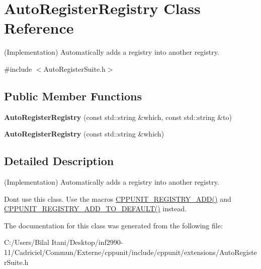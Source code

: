 \hypertarget{class_auto_register_registry}{}\section{Auto\+Register\+Registry Class Reference}
\label{class_auto_register_registry}


(Implementation) Automatically adds a registry into another registry.  




{\ttfamily \#include $<$Auto\+Register\+Suite.\+h$>$}

\subsection*{Public Member Functions}
\begin{DoxyCompactItemize}
\item 
{\bfseries Auto\+Register\+Registry} (const std\+::string \&which, const std\+::string \&to)\hypertarget{class_auto_register_registry_aeb3c0171549420bc18714d4117d9c2b5}{}\label{class_auto_register_registry_aeb3c0171549420bc18714d4117d9c2b5}

\item 
{\bfseries Auto\+Register\+Registry} (const std\+::string \&which)\hypertarget{class_auto_register_registry_a3efb50c6218f5d0e5969eb6fc8bccb23}{}\label{class_auto_register_registry_a3efb50c6218f5d0e5969eb6fc8bccb23}

\end{DoxyCompactItemize}


\subsection{Detailed Description}
(Implementation) Automatically adds a registry into another registry. 

Don\textquotesingle{}t use this class. Use the macros \hyperlink{_helper_macros_8h_a0ca9e37aca06e802300f2572b974e2bb}{C\+P\+P\+U\+N\+I\+T\+\_\+\+R\+E\+G\+I\+S\+T\+R\+Y\+\_\+\+A\+D\+D()} and \hyperlink{_helper_macros_8h_a1dde8c3db38012da58e1e456b7e4e346}{C\+P\+P\+U\+N\+I\+T\+\_\+\+R\+E\+G\+I\+S\+T\+R\+Y\+\_\+\+A\+D\+D\+\_\+\+T\+O\+\_\+\+D\+E\+F\+A\+U\+L\+T()} instead. 

The documentation for this class was generated from the following file\+:\begin{DoxyCompactItemize}
\item 
C\+:/\+Users/\+Bilal Itani/\+Desktop/inf2990-\/11/\+Cadriciel/\+Commun/\+Externe/cppunit/include/cppunit/extensions/Auto\+Register\+Suite.\+h\end{DoxyCompactItemize}
